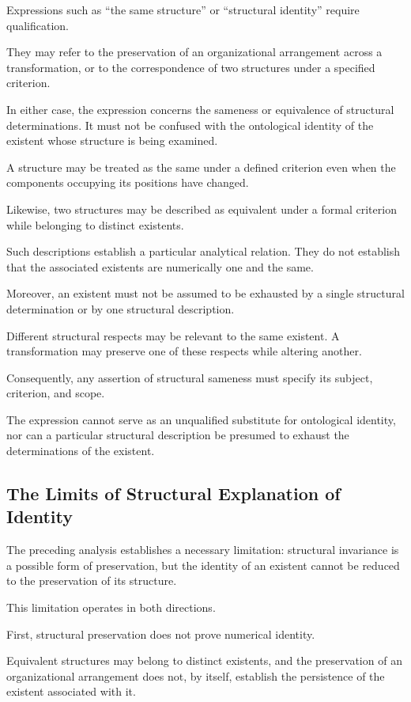 Expressions such as ``the same structure''
or ``structural identity'' require
qualification.

They may refer to the preservation of
an organizational arrangement across
a transformation, or to the correspondence
of two structures under a specified
criterion.

In either case, the expression concerns
the sameness or equivalence of structural
determinations. It must not be confused
with the ontological identity of the
existent whose structure is being examined.

A structure may be treated as the same
under a defined criterion even when
the components occupying its positions
have changed.

Likewise, two structures may be described
as equivalent under a formal criterion
while belonging to distinct existents.

Such descriptions establish a particular
analytical relation. They do not establish
that the associated existents are
numerically one and the same.

Moreover, an existent must not be assumed
to be exhausted by a single structural
determination or by one structural
description.

Different structural respects may be
relevant to the same existent. A
transformation may preserve one of
these respects while altering another.

Consequently, any assertion of structural
sameness must specify its subject,
criterion, and scope.

The expression cannot serve as an
unqualified substitute for ontological
identity, nor can a particular structural
description be presumed to exhaust
the determinations of the existent.

\subsection{The Limits of Structural Explanation of Identity}

The preceding analysis establishes
a necessary limitation: structural
invariance is a possible form of
preservation, but the identity of
an existent cannot be reduced to
the preservation of its structure.

This limitation operates in both
directions.

First, structural preservation does
not prove numerical identity.

Equivalent structures may belong
to distinct existents, and the
preservation of an organizational
arrangement does not, by itself,
establish the persistence of the
existent associated with it.

